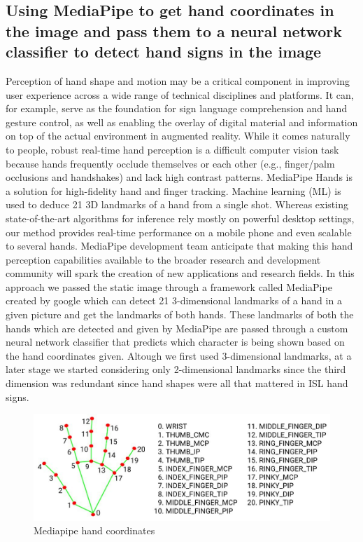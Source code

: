\documentclass[12pt,a4paper]{report}
\begin{document}
\subsection{Using MediaPipe to get hand coordinates in the image and pass them to a neural network classifier to detect hand signs in the image}
Perception of hand shape and motion may be a critical component in improving user experience across a wide range of technical disciplines and platforms. It can, for example, serve as the foundation for sign language comprehension and hand gesture control, as well as enabling the overlay of digital material and information on top of the actual environment in augmented reality. While it comes naturally to people, robust real-time hand perception is a difficult computer vision task because hands frequently occlude themselves or each other (e.g., finger/palm occlusions and handshakes) and lack high contrast patterns. MediaPipe Hands is a solution for high-fidelity hand and finger tracking. Machine learning (ML) is used to deduce 21 3D landmarks of a hand from a single shot. Whereas existing state-of-the-art algorithms for inference rely mostly on powerful desktop settings, our method provides real-time performance on a mobile phone and even scalable to several hands. MediaPipe development team anticipate that making this hand perception capabilities available to the broader research and development community will spark the creation of new applications and research fields. In this approach we passed the static image through a framework called MediaPipe created by google which can detect 21 3-dimensional landmarks of a hand in a given picture and get the landmarks of both hands. These landmarks of both the hands which are detected and given by MediaPipe are passed through a custom neural network classifier that predicts which character is being shown based on the hand coordinates given. Altough we first used 3-dimensional landmarks, at a later stage we started considering only 2-dimensional landmarks since the third dimension was redundant since hand shapes were all that mattered in ISL hand signs.
\begin{figure}[htbp]
	\centerline{\includegraphics[scale=0.3]{mediapipe.jpg}}
	\caption{Mediapipe hand coordinates}
	\label{Mediapipe}
\end{figure}
\end{document}
